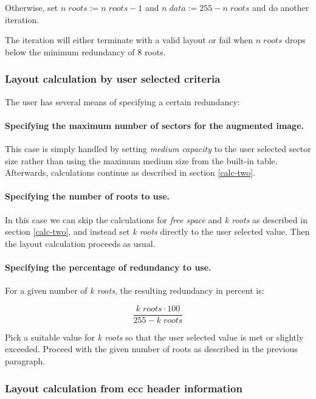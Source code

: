 \smallskip

\quad Otherwise, set $n\; roots := n\; roots - 1$ and $n\; data := 255 - n\; roots$
and do another iteration. 

\medskip

The iteration will either terminate with a valid layout or fail when
$n\; roots$ drops below the minimum redundancy of 8 roots. 

\subsubsection{Layout calculation by user selected criteria}

The user has several means of specifying a certain redundancy:

\paragraph{Specifying the maximum number of sectors for the augmented image.}

This case is simply handled by setting {\em medium capacity} to the user
selected sector size rather than using the maximum medium size from the
built-in table. Afterwards, calculations continue as described in
section \ref{calc-two}.

\paragraph{Specifying the number of roots to use.}

In this case we can skip the calculations for {\em free space} and
{\em k roots} as described in section \ref{calc-two}, and instead
set {\em k roots} directly to the user selected value. Then the
layout calculation proceeds as usual. 

\paragraph{Specifying the percentage of redundancy to use.}

For a given number of {\em k roots}, the resulting redundancy in percent is:

\[\frac{k\; roots \cdot 100}{255 - k\; roots}\]

Pick a suitable value for {\em k roots} so that the user selected value
is met or slightly exceeded. Proceed with the given number of roots
as described in the previous paragraph.

\subsubsection{Layout calculation from ecc header information}
\label{recalc-layout-header-two}

